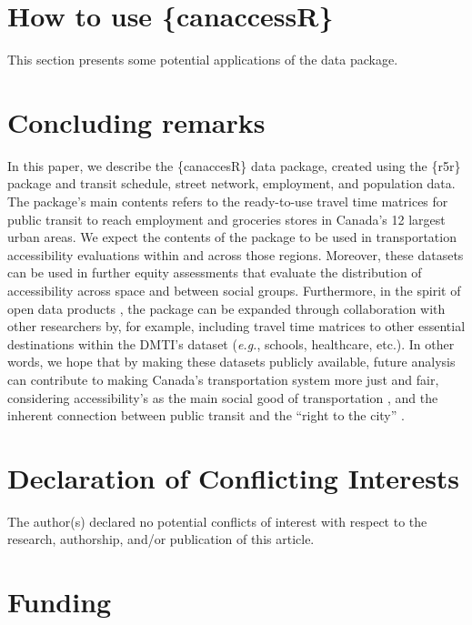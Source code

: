 \documentclass[Royal,times,sageh]{sagej}
\begin{document}
\section{How to use \{canaccessR\}}\label{how-to-use-canaccessr}

This section presents some potential applications of the data package.

\section{Concluding remarks}\label{concluding-remarks}

In this paper, we describe the \{canaccesR\} data package, created using
the \{r5r\} package and transit schedule, street network, employment,
and population data. The package's main contents refers to the
ready-to-use travel time matrices for public transit to reach employment
and groceries stores in Canada's 12 largest urban areas. We expect the
contents of the package to be used in transportation accessibility
evaluations within and across those regions. Moreover, these datasets
can be used in further equity assessments that evaluate the distribution
of accessibility across space and between social groups. Furthermore, in
the spirit of open data products
\citep{arribas-belOpenDataProductsA2021}, the package can be expanded
through collaboration with other researchers by, for example, including
travel time matrices to other essential destinations within the DMTI's
dataset (\emph{e.g.}, schools, healthcare, etc.). In other words, we
hope that by making these datasets publicly available, future analysis
can contribute to making Canada's transportation system more just and
fair, considering accessibility's as the main social good of
transportation \citep{martensTransportJusticeDesigning2016}, and the
inherent connection between public transit and the ``right to the city''
\citep{cogginRightTransportMoving2015}.

\section{Declaration of Conflicting
Interests}\label{declaration-of-conflicting-interests}

The author(s) declared no potential conflicts of interest with respect
to the research, authorship, and/or publication of this article.

\section{Funding}\label{funding}
\end{document}
